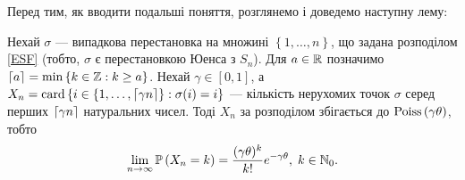 Перед тим, як вводити подальші поняття, розглянемо і доведемо наступну лему:
\begin{lemma}\label{main_lemma}
    Нехай $\sigma$ --- випадкова перестановка на множині
    $\left\{1, \dots, n\right\}$, що задана розподілом \eqref{ESF}
    (тобто, $\sigma$ є перестановкою Юенса з $S_n$).
    Для $a \in \R$ позначимо $\ceil*{a} = \min\left\{k\in\Z : k \geq a\right\}$.
    Нехай $\gamma \in [0, 1]$, а
    $X_n = \card\left\{i\in \left\{1,\dots,\ceil*{\gamma n} \right\} : \sigma(i) = i\right\}$
    --- кількість нерухомих точок
    $\sigma$ серед перших $\ceil*{\g n}$ натуральних чисел.
    Тоді $X_n$ за розподілом збігається до $\Poiss{\gamma\theta}$, тобто
    \begin{gather}
        \lim_{n\to\infty} \P{X_n = k} = \frac{(\gamma\theta)^k}{k!}e^{-\gamma\theta}, \; k \in \N_0.
    \end{gather} 
\end{lemma}

